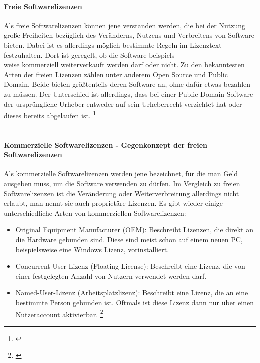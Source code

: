 \documentclass[titlepage,12pt,twoside]{article}
\begin{document}
\paragraph{Freie Softwarelizenzen}
\hfill \break
\hfill \break
Als freie Softwarelizenzen können jene verstanden werden, die bei der Nutzung große Freiheiten bezüglich des 
Veränderns, Nutzens und Verbreitens von Software bieten. Dabei ist es allerdings möglich bestimmte Regeln im 
Lizenztext festzuhalten. Dort ist geregelt, ob die Software beispiels-\\weise kommerziell weiterverkauft werden 
darf oder nicht. Zu den bekanntesten Arten der freien Lizenzen zählen unter anderem Open Source und Public 
Domain. Beide bieten größtenteils deren Software an, ohne dafür etwas bezahlen zu müssen. Der Unterschied ist 
allerdings, dass bei einer Public Domain Software der ursprüngliche Urheber entweder auf sein Urheberrecht 
verzichtet hat oder dieses bereits abgelaufen ist. \footnote{\cite{Simpleclub24}} \\
\\
\paragraph{Kommerzielle Softwarelizenzen - Gegenkonzept der freien Softwarelizenzen}
\hfill \break
\hfill \break
Als kommerzielle Softwarelizenzen werden jene bezeichnet, für die man Geld ausgeben muss, um die Software 
verwenden zu dürfen. Im Vergleich zu freien Softwarelizenzen ist die  Veränderung oder Weiterverbreitung allerdings nicht erlaubt, man nennt sie auch 
proprietäre Lizenzen. Es gibt wieder einige unterschiedliche Arten von kommerziellen Softwarelizenzen: \\
\begin{itemize}
	\item Original Equipment Manufacturer (OEM): Beschreibt Lizenzen, die direkt an die Hardware gebunden 
	sind. Diese sind meist schon auf einem neuen PC, beispielsweise eine Windows Lizenz, vorinstalliert.
	\item Concurrent User Lizenz (Floating License): Beschreibt eine Lizenz, die von einer festgelegten 
	Anzahl von Nutzern verwendet werden darf.
	\item Named-User-Lizenz (Arbeitsplatzlizenz): Beschreibt eine Lizenz, die an eine bestimmte Person 
	gebunden ist. Oftmals ist diese Lizenz dann nur über einen Nutzeraccount aktivierbar. \footnote{\cite{Simpleclub25}}
\end{itemize}
\hfill \break
\end{document}
